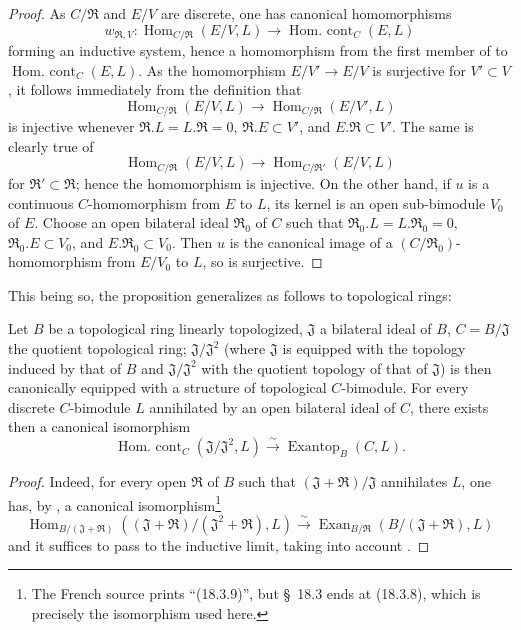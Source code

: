 \begin{proof}
As $C/\mathfrak{R}$ and $E/V$ are discrete, one has canonical homomorphisms
\[
  w_{\mathfrak{R},V}:\operatorname{Hom}_{C/\mathfrak{R}}(E/V,L)
  \longrightarrow\operatorname{Hom.\ cont}_C(E,L)
\]
forming an inductive system, hence a homomorphism from the first member of  to $\operatorname{Hom.\ cont}_C(E,L)$.
As the homomorphism $E/V'\to E/V$ is surjective for $V'\subset V$, it follows immediately from the definition that
\[
  \operatorname{Hom}_{C/\mathfrak{R}}(E/V,L)\to
  \operatorname{Hom}_{C/\mathfrak{R}}(E/V',L)
\]
is injective whenever $\mathfrak{R}.L=L.\mathfrak{R}=0$, $\mathfrak{R}.E\subset V'$, and $E.\mathfrak{R}\subset V'$.
The same is clearly true of
\[
  \operatorname{Hom}_{C/\mathfrak{R}}(E/V,L)\to
  \operatorname{Hom}_{C/\mathfrak{R}'}(E/V,L)
\]
for $\mathfrak{R}'\subset\mathfrak{R}$; hence the homomorphism  is injective.
On the other hand, if $u$ is a continuous $C$-homomorphism from $E$ to $L$, its kernel is an open sub-bimodule $V_0$ of $E$.
Choose an open bilateral ideal $\mathfrak{R}_0$ of $C$ such that $\mathfrak{R}_0.L=L.\mathfrak{R}_0=0$, $\mathfrak{R}_0.E\subset V_0$, and $E.\mathfrak{R}_0\subset V_0$.
Then $u$ is the canonical image of a $(C/\mathfrak{R}_0)$-homomorphism from $E/V_0$ to $L$, so  is surjective.
\end{proof}

This being so, the proposition  generalizes as follows to topological rings:

\begin{proposition}[18.5.4]
\label{0.18.5.4}
Let $B$ be a topological ring linearly topologized, $\mathfrak{J}$ a bilateral ideal of $B$, $C=B/\mathfrak{J}$ the quotient topological ring; $\mathfrak{J}/\mathfrak{J}^2$ \textup{(}where $\mathfrak{J}$ is equipped with the topology induced by that of $B$ and $\mathfrak{J}/\mathfrak{J}^2$ with the quotient topology of that of $\mathfrak{J}$\textup{)} is then canonically equipped with a structure of topological $C$-bimodule.
For every discrete $C$-bimodule $L$ annihilated by an open bilateral ideal of $C$, there exists then a canonical isomorphism
\begin{equation}
\tag{18.5.4.1}
  \label{0.18.5.4.1}
  \operatorname{Hom.\ cont}_C(\mathfrak{J}/\mathfrak{J}^2,L)\xrightarrow{\sim}\operatorname{Exantop}_B(C,L).
\end{equation}
\end{proposition}

\begin{proof}
Indeed, for every open $\mathfrak{R}$ of $B$ such that $(\mathfrak{J}+\mathfrak{R})/\mathfrak{J}$ annihilates $L$, one has, by , a canonical isomorphism\footnote{The French source prints ``(18.3.9)'', but \S~18.3 ends at (18.3.8), which is precisely the isomorphism used here.}
\[
  \operatorname{Hom}_{B/(\mathfrak{J}+\mathfrak{R})}((\mathfrak{J}+\mathfrak{R})/(\mathfrak{J}^2+\mathfrak{R}),L)\xrightarrow{\sim}\operatorname{Exan}_{B/\mathfrak{R}}(B/(\mathfrak{J}+\mathfrak{R}),L)
\]
and it suffices to pass to the inductive limit, taking into account .
\end{proof}
